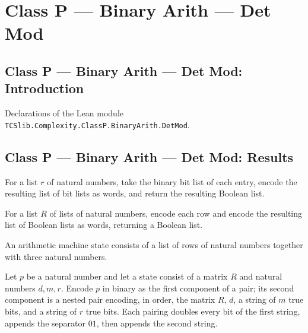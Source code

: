\section{Class P --- Binary Arith --- Det Mod}
\subsection*{Class P --- Binary Arith --- Det Mod: Introduction}

Declarations of the Lean module \texttt{TCSlib.Complexity.ClassP.BinaryArith.DetMod}.

\subsection*{Class P --- Binary Arith --- Det Mod: Results}

\begin{definition}
\label{Complexity.BinArith.encRow}
\leanok
{}
For a list $r$ of natural numbers, take the binary bit list of each entry, encode the
resulting list of bit lists as words, and return the resulting Boolean list.
\end{definition}

\begin{definition}
\label{Complexity.BinArith.encMat}
\leanok
{}
For a list $R$ of lists of natural numbers, encode each row and encode the resulting
list of Boolean lists as words, returning a Boolean list.
\end{definition}

\begin{definition}
\label{Complexity.BinArith.DState}
\leanok
An arithmetic machine state consists of a list of rows of natural numbers together with
three natural numbers.
\end{definition}

\begin{definition}
\label{Complexity.BinArith.encState}
\leanok
{}
Let $p$ be a natural number and let a state consist of a matrix $R$ and natural numbers
$d,m,r$. Encode $p$ in binary as the first component of a pair; its second component is
a nested pair encoding, in order, the matrix $R$, $d$, a string of $m$ true bits, and a
string of $r$ true bits. Each pairing doubles every bit of the first string, appends the
separator $01$, then appends the second string.
\end{definition}

